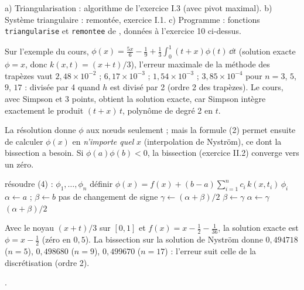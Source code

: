 a) Triangularisation : algorithme de l'exercice I.3 (avec pivot maximal).
b) Système triangulaire : remontée, exercice I.1.
c) Programme : fonctions \texttt{triangularise} et \texttt{remontee} de
, données à l'exercice 10 ci-dessus.

\Verif Sur l'exemple du cours, $\phi(x) = \frac{5x}6 - \frac19 +
\frac13\int_0^1(t + x)\phi(t)\,\dd t$ (solution exacte $\phi = x$, donc
$k(x,t) = (x + t)/3$), l'erreur maximale de la méthode des trapèzes vaut
$2{,}48\times 10^{-2}$ ; $6{,}17\times 10^{-3}$ ; $1{,}54\times 10^{-3}$ ;
$3{,}85\times 10^{-4}$ pour $n = 3$, $5$, $9$, $17$ : divisée par 4 quand $h$ est
divisé par 2 (ordre 2 des trapèzes). Le cours, avec Simpson et 3 points, obtient
la solution exacte, car Simpson intègre exactement le produit
$(t + x)\,t$, polynôme de degré 2 en $t$.

\Pourquoi La résolution donne $\phi$ aux nœuds seulement ; mais la formule (2)
permet ensuite de calculer $\phi(x)$ en \emph{n'importe quel} $x$ (interpolation
de Nyström), ce dont la bissection a besoin. Si $\phi(a)\phi(b) < 0$, la
bissection (exercice II.2) converge vers un zéro.
\begin{algo}
  \State résoudre (4) : $\phi_1, \dots, \phi_n$
  \State définir $\phi(x) = f(x) + (b-a)\sum_{i=1}^{n}c_i\,k(x,t_i)\,\phi_i$
  \State $\alpha \leftarrow a$ ; $\beta \leftarrow b$
   \Print \og pas de changement de signe \fg{} \Stop \EndIf
  \While{$\beta - \alpha > \varepsilon$}
    \State $\gamma \leftarrow (\alpha + \beta)/2$
     \State $\beta \leftarrow \gamma$ \Else \State $\alpha \leftarrow \gamma$ \EndIf
  \EndWhile
  \Print $(\alpha + \beta)/2$
\end{algo}

\Verif Avec le noyau $(x + t)/3$ sur $[0,1]$ et $f(x) = x - \frac12 - \frac1{36}$,
la solution exacte est $\phi = x - \frac12$ (zéro en $0{,}5$). La bissection sur
la solution de Nyström donne $0{,}494718$ ($n = 5$), $0{,}498680$ ($n = 9$),
$0{,}499670$ ($n = 17$) : l'erreur suit celle de la discrétisation (ordre 2).

\Refs {}.
